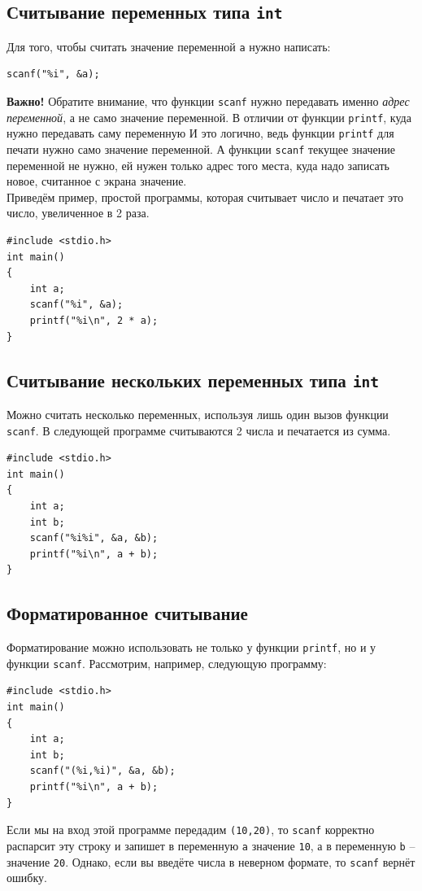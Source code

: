 \documentclass[10pt]{article}
\begin{document}
\subsection*{Считывание переменных типа \texttt{int}}
Для того, чтобы считать значение переменной \texttt{a} нужно написать:
\begin{lstlisting}
scanf("%i", &a);
\end{lstlisting}
\textbf{Важно!} Обратите внимание, что функции \texttt{scanf} нужно передавать именно \textit{адрес переменной}, а не само значение переменной. В отличии от функции \texttt{printf}, куда нужно передавать саму переменную
И это логично, ведь функции \texttt{printf} для печати нужно само значение переменной.
А функции \texttt{scanf} текущее значение переменной не нужно, ей нужен только адрес того места, куда надо записать новое, считанное с экрана значение.\\
\noindent Приведём пример, простой программы, которая считывает число и печатает это число, увеличенное в 2 раза.
\begin{lstlisting}
#include <stdio.h>
int main()
{
    int a;
    scanf("%i", &a);
    printf("%i\n", 2 * a);
}
\end{lstlisting}

\subsection*{Считывание нескольких переменных типа \texttt{int}}
Можно считать несколько переменных, используя лишь один вызов функции \texttt{scanf}. В следующей программе считываются 2 числа и печатается из сумма.
\begin{lstlisting}
#include <stdio.h>
int main()
{
    int a;
    int b;
    scanf("%i%i", &a, &b);
    printf("%i\n", a + b);
}
\end{lstlisting}

\subsection*{Форматированное считывание}
Форматирование можно использовать не только у функции \texttt{printf}, но и у функции \texttt{scanf}.
Рассмотрим, например, следующую программу:
\begin{lstlisting}
#include <stdio.h>
int main()
{
    int a;
    int b;
    scanf("(%i,%i)", &a, &b);
    printf("%i\n", a + b);
}
\end{lstlisting}
Если мы на вход этой программе передадим \texttt{(10,20)}, то \texttt{scanf} корректно распарсит эту строку и запишет в переменную \texttt{a} значение \texttt{10}, а в переменную \texttt{b} -- значение \texttt{20}. Однако, если вы введёте числа в неверном формате, то \texttt{scanf} вернёт ошибку.
\end{document}

